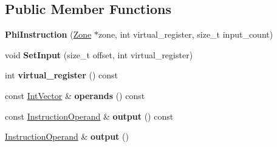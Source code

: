 \subsection*{Public Member Functions}
\begin{DoxyCompactItemize}
\item 
{\bfseries Phi\+Instruction} (\hyperlink{classv8_1_1internal_1_1_zone}{Zone} $\ast$zone, int virtual\+\_\+register, size\+\_\+t input\+\_\+count)\hypertarget{classv8_1_1internal_1_1compiler_1_1_phi_instruction_a913a59d9a1a1a99aa901a6fb66afb66d}{}\label{classv8_1_1internal_1_1compiler_1_1_phi_instruction_a913a59d9a1a1a99aa901a6fb66afb66d}

\item 
void {\bfseries Set\+Input} (size\+\_\+t offset, int virtual\+\_\+register)\hypertarget{classv8_1_1internal_1_1compiler_1_1_phi_instruction_aa1c3ab51327ba7b508b7e9bd082cf633}{}\label{classv8_1_1internal_1_1compiler_1_1_phi_instruction_aa1c3ab51327ba7b508b7e9bd082cf633}

\item 
int {\bfseries virtual\+\_\+register} () const \hypertarget{classv8_1_1internal_1_1compiler_1_1_phi_instruction_a6645803bef8c976647210b7426c6e2d1}{}\label{classv8_1_1internal_1_1compiler_1_1_phi_instruction_a6645803bef8c976647210b7426c6e2d1}

\item 
const \hyperlink{classv8_1_1internal_1_1_zone_vector}{Int\+Vector} \& {\bfseries operands} () const \hypertarget{classv8_1_1internal_1_1compiler_1_1_phi_instruction_abc3247273eb2257b641f920a37ba7bdd}{}\label{classv8_1_1internal_1_1compiler_1_1_phi_instruction_abc3247273eb2257b641f920a37ba7bdd}

\item 
const \hyperlink{classv8_1_1internal_1_1compiler_1_1_instruction_operand}{Instruction\+Operand} \& {\bfseries output} () const \hypertarget{classv8_1_1internal_1_1compiler_1_1_phi_instruction_a39f5287d300c195a943348f6fd163f6e}{}\label{classv8_1_1internal_1_1compiler_1_1_phi_instruction_a39f5287d300c195a943348f6fd163f6e}

\item 
\hyperlink{classv8_1_1internal_1_1compiler_1_1_instruction_operand}{Instruction\+Operand} \& {\bfseries output} ()\hypertarget{classv8_1_1internal_1_1compiler_1_1_phi_instruction_a871b32649094231f1491d8a41da377c4}{}\label{classv8_1_1internal_1_1compiler_1_1_phi_instruction_a871b32649094231f1491d8a41da377c4}

\end{DoxyCompactItemize}
